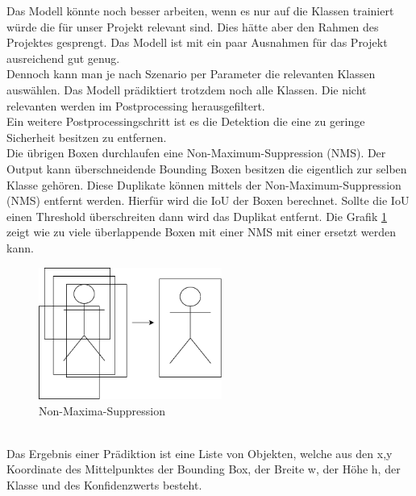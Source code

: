 \documentclass[conference]{IEEEtran}
\begin{document}
	Das Modell könnte noch besser arbeiten, wenn es nur auf die Klassen trainiert würde die für unser Projekt relevant sind. Dies hätte aber den Rahmen des Projektes gesprengt. Das Modell ist mit ein paar Ausnahmen für das Projekt ausreichend gut genug.\\
	Dennoch kann man je nach Szenario per Parameter die relevanten Klassen auswählen. Das Modell prädiktiert trotzdem noch alle Klassen. Die nicht relevanten werden im Postprocessing herausgefiltert.\\
	Ein weitere Postprocessingschritt ist es die Detektion die eine zu geringe Sicherheit besitzen zu entfernen.\\
	Die übrigen Boxen durchlaufen eine Non-Maximum-Suppression (NMS)\cite{nms}.
	Der Output kann überschneidende Bounding Boxen besitzen die eigentlich zur selben Klasse gehören. Diese Duplikate können mittels der Non-Maximum-Suppression (NMS) entfernt werden. Hierfür wird die IoU der Boxen berechnet. Sollte die IoU einen Threshold überschreiten dann wird das Duplikat entfernt. Die Grafik \ref{NMS} zeigt wie zu viele überlappende Boxen mit einer NMS mit einer ersetzt werden kann.
	\begin{figure}[!h]
		\begin{center}
			\includegraphics[width=6cm]{Media/NMS.png}
			\caption{Non-Maxima-Suppression}
			\label{NMS}
		\end{center}
	\end{figure}\\
	Das Ergebnis einer Prädiktion ist eine Liste von Objekten, welche aus den x,y Koordinate des Mittelpunktes der Bounding Box, der Breite w, der Höhe h, der Klasse und des Konfidenzwerts besteht.
	
\end{document}
